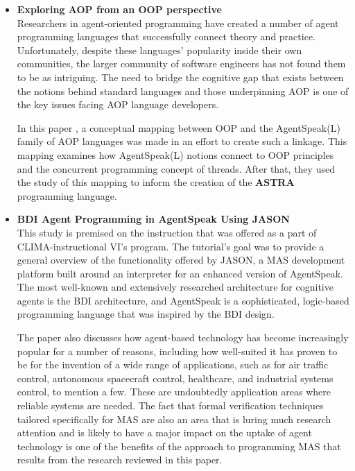\begin{itemize}
\item \textbf{Exploring AOP from an OOP perspective}\\

Researchers in agent-oriented programming have created a number of agent programming languages that successfully connect theory and practice. Unfortunately, despite these languages' popularity inside their own communities, the larger community of software engineers has not found them to be as intriguing. The need to bridge the cognitive gap that exists between the notions behind standard languages and those underpinning \ac{AOP} is one of the key issues facing \ac{AOP} language developers. 
 
 \vspace{.5cm}
 
In this paper \cite{astra}, a conceptual mapping between \ac{OOP} and the AgentSpeak(L) family of \ac{AOP} languages was made in an effort to create such a linkage. This mapping examines how AgentSpeak(L) notions connect to \ac{OOP} principles and the concurrent programming concept of threads. After that, they used the study of this mapping to inform the creation of the \textbf{\ac{ASTRA}} programming language.

 \vspace{.5cm}
 
\item \textbf{\ac{BDI} Agent Programming in AgentSpeak Using JASON} \\

This study \cite{jasonBDI} is premised on the instruction that was offered as a part of CLIMA-instructional VI's program. The tutorial's goal was to provide a general overview of the functionality offered by JASON, a \ac{MAS} development platform built around an interpreter for an enhanced version of AgentSpeak. The most well-known and extensively researched architecture for cognitive agents is the \ac{BDI} architecture, and AgentSpeak is a sophisticated, logic-based programming language that was inspired by the \ac{BDI} design.

\vspace{.5cm}

The paper also discusses how agent-based technology has become increasingly popular for a number of reasons, including how well-suited it has proven to be for the invention of a wide range of applications, such as for air traffic control, autonomous spacecraft control, healthcare, and industrial systems control, to mention a few. These are undoubtedly application areas where reliable systems are needed. The fact that formal verification techniques tailored specifically for \ac{MAS} are also an area that is luring much research attention and is likely to have a major impact on the uptake of agent technology is one of the benefits of the approach to programming \ac{MAS} that results from the research reviewed in this paper.


\end{itemize}
